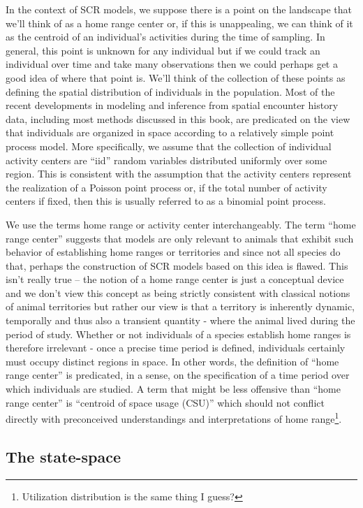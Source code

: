In the context of SCR models, we suppose there is a point on the
landscape that we'll think of as a home range center or, if this is
unappealing, we can think of it as the centroid of an individual's
activities during the time of sampling. In general, this point is
unknown for any individual but if we could track an individual over
time and take many observations then we could perhaps get a good idea
of where that point is.  We'll think of the collection of these points
as defining the spatial distribution of individuals in the
population. Most of the recent developments in modeling and inference
from spatial encounter history data, including most methods discussed
in this book, are predicated on the view that individuals are
organized in space according to a relatively simple point process
model. More specifically, we assume that the collection of individual
activity centers are ``iid'' random variables distributed uniformly
over some region. This is consistent with the assumption that the
activity centers represent the realization of a Poisson point process
or, if the total number of activity centers if fixed, then this is
usually referred to as a binomial point process.

We use the terms home range or activity center interchangeably. The
term ``home range center'' suggests that models are only relevant to
animals that exhibit such behavior of establishing home ranges or
territories and since not all species do that, perhaps the
construction of SCR models based on this idea is flawed. This isn't
really true -- the notion of a home range center is just a conceptual
device and we don't view this concept as being strictly consistent
with classical notions of animal territories but rather our view is
that a territory is inherently dynamic, temporally and thus also a
transient quantity - where the animal lived during the period of
study.  Whether or not individuals of a species establish home ranges
is therefore irrelevant - once a precise time period is defined,
individuals certainly must occupy distinct regions in space. In other
words, the definition of ``home range center'' is predicated, in a
sense, on the specification of a time period over which individuals
are studied. A term that might be less offensive than ``home range
center'' is ``centroid of space usage (CSU)'' which should not
conflict directly with preconceived understandings and interpretations
of home range\footnote{Utilization distribution is the same thing
  I guess?}.


\subsection{The state-space}

